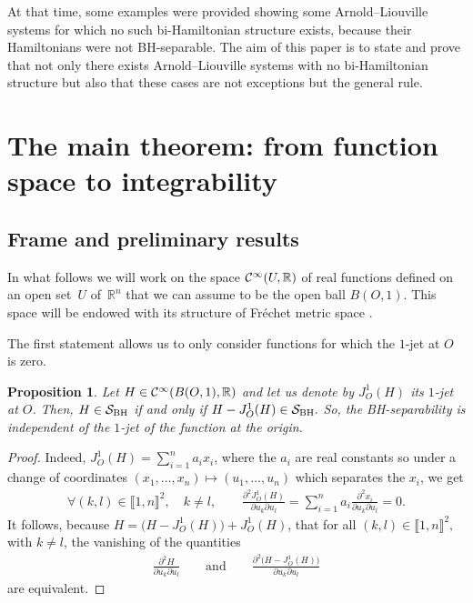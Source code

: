 \documentclass[pdftex]{sigma}%
\numberwithin{equation}{section}
\newtheorem{Proposition}[Theorem]{Proposition}
 { \theoremstyle{definition}
\newtheorem{Remark}[Theorem]{Remark} }
\begin{document}
At that time, some examples were provided \cite{Br,BrMoTu,Fe} showing some Arnold--Liouville systems for which no such bi-Hamiltonian structure exists, because their Hamiltonians were not BH-separable. The aim of this paper is to state and prove that not only there exists Arnold--Liouville systems with no bi-Hamiltonian structure but also that these cases are not exceptions but the general rule.

\section{The main theorem: from function space to integrability }

\subsection{Frame and preliminary results}

In what follows we will work on the space ${\cal C}^{\infty}(U,\mathbb{R})$ of real functions defined on an open set~$U$ of~$\mathbb{R}^n$ that we can assume to be the open ball $B(O,1)$. This space will be endowed with its structure of Fr\'echet metric space \cite{Hi}.

The first statement allows us to only consider functions for which the $1$-jet at $O$ is zero.

\begin{Proposition}
	Let $H\in{\cal C}^{\infty}(B(O,1),\mathbb{R})$ and let us denote by $J_O^1(H)$ its $1$-jet at $O$. Then,
	$H\in{\cal S}_{\rm BH}$ if and only if $H-J_O^1(H)\in{\cal S}_{\rm BH}.$
	So, the BH-separability is independent of the $1$-jet of the function at the origin.
\end{Proposition}

\begin{proof}
	Indeed, $J_O^1(H)=\sum_{i=1}^na_ix_i$, where the $a_i$ are real constants so under a change of coordinates $(x_1,\dots,x_n)\mapsto(u_1,\dots,u_n)$ which separates the $x_i$, we get
\begin{gather*}
\forall (k,l)\in\llbracket 1,n\rrbracket^2, \quad k\not=l,\qquad
\frac{\partial^2 J_O^1(H)}{\partial u_k\partial u_l}
=\sum_{i=1}^na_i\frac{\partial^2 x_i}{\partial u_k\partial u_l}=0.
\end{gather*}
	It follows, because $H=\big(H-J_O^1(H)\big)+J_O^1(H)$, that
	for all	$(k,l)\in\llbracket 1,n\rrbracket^2,$ with $k\not=l$, the vanishing of the quantities
\begin{gather*}
\frac{\partial^2 H}{\partial u_k\partial u_l}\qquad \text{and}\qquad \frac{\partial^2 \big(H-J_O^1(H)\big)}{\partial u_k\partial u_l}
\end{gather*}
are equivalent.	
\end{proof}
\end{document}
